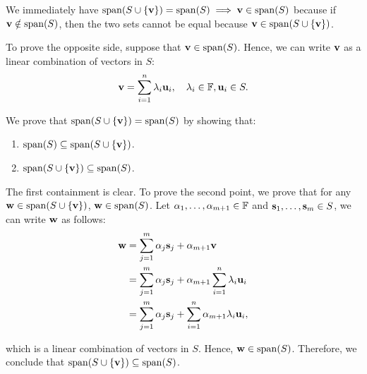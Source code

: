 \begin{proof*}
	We immediately have $\mathrm{span} (S\cup\{{\bf v}\}) = \mathrm{span} (S) \implies {\bf v}\in\mathrm{span}(S)$	because if ${\bf v}\notin\mathrm{span}(S)$, then the two sets cannot be equal because ${\bf v}\in\mathrm{span}(S\cup\{{\bf v}\})$.

	\noindent\newline To prove the opposite side, suppose that ${\bf v}\in\mathrm{span}(S)$. Hence, we can write ${\bf v}$ as a linear combination of vectors in $S$:
	\begin{align*}
		{\bf v} = \sum_{i=1}^n \lambda_i {\bf u}_i, \quad \lambda_i \in \mathbb{F}, {\bf u}_i \in S.	
	\end{align*} 

	\noindent We prove that $\mathrm{span} (S\cup\{{\bf v}\}) = \mathrm{span}(S)$ by showing that: 
	\begin{enumerate}
		\item $\mathrm{span} (S)\subseteq \mathrm{span} (S\cup\{{\bf v}\})$.
		\item $\mathrm{span} (S\cup\{{\bf v}\})\subseteq \mathrm{span} (S)$.
	\end{enumerate} 

	\noindent The first containment is clear. To prove the second point, we prove that for any ${\bf w} \in \mathrm{span}(S\cup\{{\bf v}\})$, ${\bf w}\in\mathrm{span}(S)$. Let $\alpha_1, \dots, \alpha_{m+1} \in \mathbb{F}$ and ${\bf s}_1, \dots, {\bf s}_m \in S$, we can write ${\bf w}$ as follows:
	\begin{align*}
		{\bf w} &= \sum_{j=1}^m \alpha_j {\bf s}_j + \alpha_{m+1}{\bf v} \\
			&= \sum_{j=1}^m \alpha_j {\bf s}_j + \alpha_{m+1}\sum_{i=1}^n \lambda_i {\bf u}_i \\
			&= \sum_{j=1}^m \alpha_j {\bf s}_j + \sum_{i=1}^n \alpha_{m+1}\lambda_i {\bf u}_i,
	\end{align*} 

	\noindent which is a linear combination of vectors in $S$. Hence, ${\bf w}\in\mathrm{span}(S)$. Therefore, we conclude that $\mathrm{span}(S\cup\{{\bf v}\}) \subseteq \mathrm{span}(S)$.
\end{proof*} 

